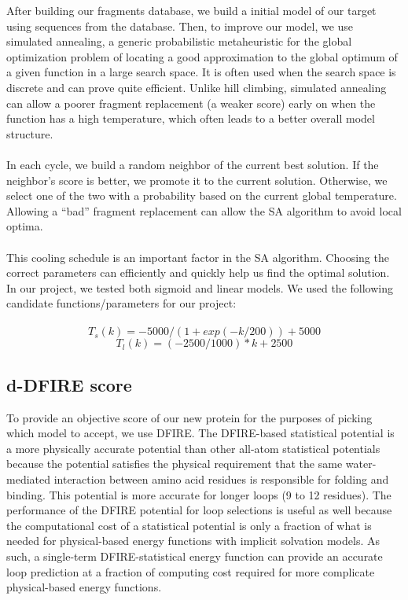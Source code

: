 \documentclass{article}
\begin{document}
\begin{enumerate}
After building our fragments database, we build a initial model of our target using sequences from the database. Then, to improve our model, we use simulated annealing, a generic probabilistic metaheuristic for the global optimization problem of locating a good approximation to the global optimum of a given function in a large search space. It is often used when the search space is discrete and can prove quite efficient. Unlike hill climbing, simulated annealing can allow a poorer fragment replacement (a weaker score) early on when the function has a high temperature, which often leads to a better overall model structure. \\\\
In each cycle, we build a random neighbor of the current best solution. If the neighbor’s score is better, we promote it to  the current solution. Otherwise, we select one of the two with a probability based on the current global temperature.  Allowing a “bad” fragment replacement can allow the SA algorithm to avoid local optima.  \\\\
     This cooling schedule is an important factor in the SA algorithm. Choosing the correct parameters can efficiently and quickly help us find the optimal solution. In our project, we tested both sigmoid and linear models. We used the following candidate functions/parameters for our project:\\\\
\begin{equation*}
      T_s(k) =  -5000/(1+ exp(-k/200))+5000
    \end{equation*}
\begin{equation*}
      T_l(k) =  (-2500/1000)*k + 2500
    \end{equation*}



\subsection{d-DFIRE score}

To provide an objective score of our new protein for the purposes of picking which model to accept, we use DFIRE.  The DFIRE-based statistical potential is a more physically accurate potential than other all-atom statistical potentials because the potential satisfies the physical requirement that the same water-mediated interaction between amino acid residues is responsible for folding and binding.   This potential is more accurate for longer loops (9 to 12 residues). The performance of the DFIRE potential for loop selections is useful as well because the computational cost of a statistical potential is only a fraction of what is needed for physical-based energy functions with implicit solvation models. As such, a single-term DFIRE-statistical energy function can provide an accurate loop prediction at a fraction of computing cost required for more complicate physical-based energy functions.


\end{enumerate}
\end{document}
